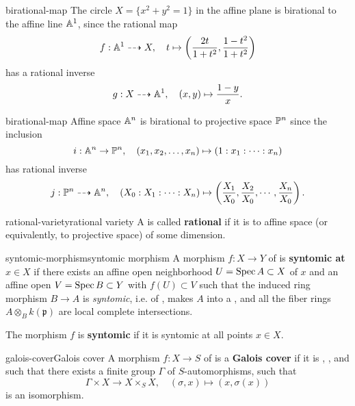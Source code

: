 \begin{example}{birational-map}
    The circle $X = \{ x^2 + y^2 = 1 \}$ in the affine plane is birational to the affine line $\AA^1$, since the rational map
    \[ f : \AA^1 \dashrightarrow X, \quad t \mapsto \left(\frac{2t}{1 + t^2}, \frac{1 - t^2}{1 + t^2}\right) \]
    has a rational inverse
    \[ g : X \dashrightarrow \AA^1, \quad (x, y) \mapsto \frac{1 - y}{x} . \]
\end{example}

\begin{example}{birational-map}
    Affine space $\AA^n$ is birational to projective space $\PP^n$ since the inclusion
    \[ i : \AA^n \to \PP^n, \quad (x_1, x_2, \ldots, x_n) \mapsto (1 : x_1 : \cdots : x_n) \]
    has rational inverse
    \[ j : \PP^n \dashrightarrow \AA^n, \quad (X_0 : X_1 : \cdots : X_n) \mapsto \left(\frac{X_1}{X_0}, \frac{X_2}{X_0}, \cdots, \frac{X_n}{X_0}\right) . \]
\end{example}

\begin{topic}{rational-variety}{rational variety}
    A  is called \textbf{rational} if it is  to affine space (or equivalently, to projective space) of some dimension.
\end{topic}

\begin{topic}{syntomic-morphism}{syntomic morphism}
    A morphism $f : X \to Y$ of  is \textbf{syntomic at $x \in X$} if there exists an affine open neighborhood $U = \Spec A \subset X$ of $x$ and an affine open $V = \Spec B \subset Y$ with $f(U) \subset V$ such that the induced ring morphism $B \to A$ is \textit{syntomic}, i.e. of , makes $A$ into a  , and all the fiber rings $A \otimes_B k(\mathfrak{p})$ are local complete intersections.
    
    The morphism $f$ is \textbf{syntomic} if it is syntomic at all points $x \in X$.
\end{topic}

\begin{topic}{galois-cover}{Galois cover}
    A morphism $f : X \to S$ of  is a \textbf{Galois cover} if it is , , and such that there exists a finite group $\Gamma$ of $S$-automorphisms, such that
    \[ \Gamma \times X \to X \times_S X, \quad (\sigma, x) \mapsto (x, \sigma(x)) \]
    is an isomorphism.
\end{topic}

